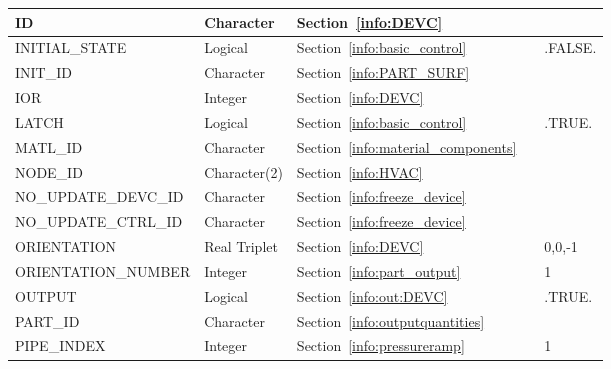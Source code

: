 \documentclass[11pt]{book}
\begin{document}
\begin{longtable}{@{\extracolsep{\fill}}|l|l|l|l|l|}
{\ct ID}                    & Character       & Section~\ref{info:DEVC}                                         &       &               \\ \hline
{\ct INITIAL\_STATE}        & Logical         & Section~\ref{info:basic_control}                                &       & {\ct .FALSE.} \\ \hline
{\ct INIT\_ID}              & Character       & Section~\ref{info:PART_SURF}                                    &       &               \\ \hline
{\ct IOR}                   & Integer         & Section~\ref{info:DEVC}                                         &       &               \\ \hline
{\ct LATCH}                 & Logical         & Section~\ref{info:basic_control}                                &       & {\ct .TRUE.}  \\ \hline
{\ct MATL\_ID}              & Character       & Section~\ref{info:material_components}                          &       &               \\ \hline
{\ct NODE\_ID}              & Character(2)    & Section~\ref{info:HVAC}                                         &       &               \\ \hline
{\ct NO\_UPDATE\_DEVC\_ID}  & Character       & Section~\ref{info:freeze_device}                                &       &               \\ \hline
{\ct NO\_UPDATE\_CTRL\_ID}  & Character       & Section~\ref{info:freeze_device}                                &       &               \\ \hline
{\ct ORIENTATION}           & Real Triplet    & Section~\ref{info:DEVC}                                         &       & 0,0,-1        \\ \hline
{\ct ORIENTATION\_NUMBER}   & Integer         & Section~\ref{info:part_output}                                  &       & 1             \\ \hline
{\ct OUTPUT}                & Logical         & Section~\ref{info:out:DEVC}                                     &       & {\ct .TRUE.}  \\ \hline
{\ct PART\_ID}              & Character       & Section~\ref{info:outputquantities}                             &       &               \\ \hline
{\ct PIPE\_INDEX}           & Integer         & Section~\ref{info:pressureramp}                                 &       &  1            \\ \hline

\end{longtable}
\end{document}
